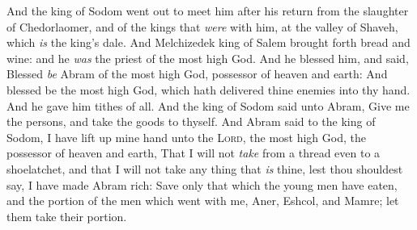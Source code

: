 \documentclass[11pt,letterpaper,oneside]{memoir}
\begin{document}
And the king of Sodom went out to meet him after his return from the
slaughter of Chedorlaomer, and of the kings that \emph{were} with him,
at the valley of Shaveh, which \emph{is} the king's dale. And
Melchizedek king of Salem brought forth bread and wine: and he
\emph{was} the priest of the most high God. And he blessed him, and
said, Blessed \emph{be} Abram of the most high God, possessor of heaven
and earth: And blessed be the most high God, which hath delivered thine
enemies into thy hand. And he gave him tithes of all. And the king of
Sodom said unto Abram, Give me the persons, and take the goods to
thyself. And Abram said to the king of Sodom, I have lift up mine hand
unto the \textsc{Lord}, the most high God, the possessor of heaven and
earth, That I will not \emph{take} from a thread even to a shoelatchet,
and that I will not take any thing that \emph{is} thine, lest thou
shouldest say, I have made Abram rich: Save only that which the young
men have eaten, and the portion of the men which went with me, Aner,
Eshcol, and Mamre; let them take their portion.
\end{document}
